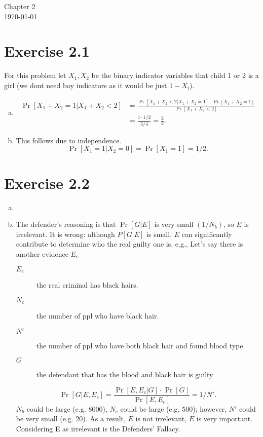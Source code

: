 \documentclass[12pt]{article}
\newcommand{\bayes}[2]{\frac{\Pr[#2|#1] \cdot \Pr[#1]}{\Pr[#2]}}
\begin{document}
\begin{center}
{\Large Chapter 2}\\
\today
\end{center}
\section*{Exercise 2.1}
For this problem let $X_1, X_2$ be the binary indicator variables that child 1 or 2
is a girl (we dont need boy indicators as it would be just $1 - X_i$).
\begin{enumerate}[a)]
    \item
        \begin{align*}
            \Pr[X_1 + X_2 = 1| X_1 + X_2 < 2] &= \bayes{X_1 + X_2 = 1}{X_1 + X_2 < 2}\\
            &= \frac{1 \cdot 1/2}{3/4} = \frac{2}{3}.
        \end{align*}
    \item
        This follows due to independence.
        \[\Pr[X_1 = 1|X_2 = 0] = \Pr[X_1 = 1] = 1/2.\]
\end{enumerate}
\section*{Exercise 2.2}
\begin{enumerate}[a)]
    \item 
    \item
        The defender's reasoning is that $\Pr[G|E]$ is very small $(1/N_b)$, so
        $E$ is irrelevant. It is wrong: although $P[G|E]$ is small, $E$ can
        significantly contribute to determine who the real guilty one is. 
        e.g., Let's say there is another evidence $E_c$

        \begin{description}
            \item[$E_c$] the real criminal has black hairs. 
            \item[$N_c$] the number of ppl who have black hair.
            \item[$N'$] the number of ppl who have both black hair and found blood type.
            \item[$G$] the defendant that has the blood and black hair is guilty
        \end{description}
        \[\Pr[G|E, E_c] = \frac{\Pr[E, E_c|G] \cdot \Pr[G]}{\Pr[E, E_c]} = 1/N'.\]
        $N_b$ could be large (e.g. 8000), $N_c$ could be large (e.g. 500); however,
        $N'$ could be very small (e.g. 20).  As a result, $E$ is not irrelevant, $E$
        is very important. Considering E as irrelevant is the Defenders' Fallacy.
\end{enumerate}
\end{document}
